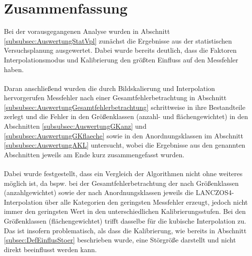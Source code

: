 \documentclass[
fontsize=10pt, 
listof = totoc,
parskip = half	
]{report}
\begin{document}
\section{Zusammenfassung}
\label{sec:Zusammenfassung}
Bei der vorausgegangenen Analyse wurden in Abschnitt \ref{subsubsec:AuswertungStatVpl} zunächst die Ergebnisse aus der statistischen Versuchsplanung ausgewertet. Dabei wurde bereits deutlich, dass die Faktoren Interpolationsmodus und Kalibrierung den größten Einfluss auf den Messfehler haben.
\\\\
\noindent Daran anschließend wurden  die durch Bildskalierung und Interpolation hervorgerufen Messfehler nach einer Gesamtfehlerbetrachtung in Abschnitt \ref{subsubsec:AuswertungGesamtfehlerbetrachtung} schrittweise in ihre Bestandteile zerlegt und die Fehler in den Größenklassen (anzahl- und flächengewichtet) in den Abschnitten \ref{subsubsec:AuswertungGKanz} und \ref{subsubsec:AuswertungGKflaeche} sowie in den Anordnungsklassen im Abschnitt \ref{subsubsec:AuswertungAKL} untersucht, wobei die Ergebnisse aus den genannten Abschnitten jeweils am Ende kurz zusammengefasst wurden.
\\\\
\noindent Dabei wurde festgestellt, dass ein Vergleich der Algorithmen nicht ohne weiteres möglich ist, da bspw. bei der Gesamtfehlerbetrachtung der nach Größenklassen (anzahlgewichtet) sowie der nach Anordnungsklassen jeweils die LANCZOS4- Interpolation über alle Kategorien den geringsten Messfehler erzeugt, jedoch nicht immer den geringsten Wert in den unterschiedlichen Kalibrierungsstufen. Bei den Größenklassen (flächengewichtet) trifft dasselbe für die kubische Interpolation zu. Das ist insofern problematisch, als dass die Kalibrierung, wie bereits in Abschnitt \ref{subsec:DefEinflusStoer} beschrieben wurde, eine Störgröße darstellt und nicht direkt beeinflusst werden kann.
\\\\
\end{document}
